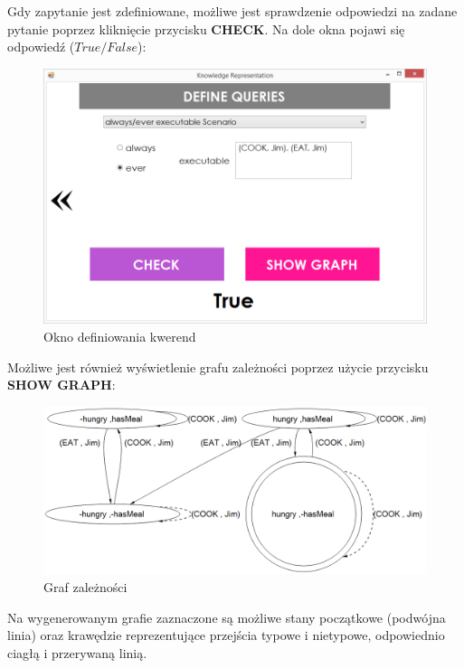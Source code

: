 \documentclass{article}
\begin{document}
Gdy zapytanie jest zdefiniowane, możliwe jest sprawdzenie odpowiedzi na zadane pytanie poprzez kliknięcie przycisku \textbf{CHECK}. Na dole okna pojawi się odpowiedź ($True/False$):

\begin{figure}[H]
\centering
\includegraphics[scale=0.4]{13}
\caption{Okno definiowania kwerend}
\end{figure}

\newpage

Możliwe jest również wyświetlenie grafu zależności poprzez użycie przycisku  \textbf{SHOW GRAPH}:

\begin{figure}[H]
\centering
\includegraphics[scale=0.4]{14}
\caption{Graf zależności}
\end{figure}

Na wygenerowanym grafie zaznaczone są możliwe stany początkowe (podwójna linia) oraz krawędzie reprezentujące przejścia typowe i nietypowe, odpowiednio ciagłą i przerywaną linią.
\end{document}
